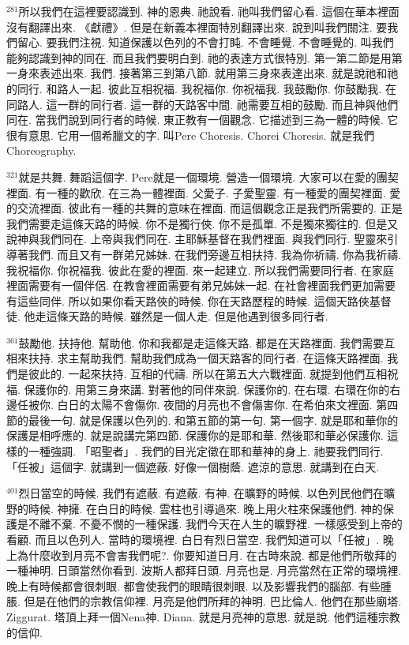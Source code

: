 \documentclass{book}
\begin{document}
$^{281}$所以我們在這裡要認識到.
神的恩典.
祂說看.
祂叫我們留心看.
這個在華本裡面沒有翻譯出來.
《獻禮》.
但是在新義本裡面特別翻譯出來.
說到叫我們關注.
要我們留心.
要我們注視.
知道保護以色列的不會打盹.
不會睡覺.
不會睡覺的.
叫我們能夠認識到神的同在.
而且我們要明白到.
祂的表達方式很特別.
第一第二節是用第一身來表述出來.
我們.
接著第三到第八節.
就用第三身來表達出來.
就是說祂和祂的同行.
和路人一起.
彼此互相祝福.
我祝福你.
你祝福我.
我鼓勵你.
你鼓勵我.
在同路人.
這一群的同行者.
這一群的天路客中間.
祂需要互相的鼓勵.
而且神與他們同在.
當我們說到同行者的時候.
東正教有一個觀念.
它描述到三為一體的時候.
它很有意思.
它用一個希臘文的字.
叫Pere Choresis.
Chorei Choresis.
就是我們Choreography.

$^{321}$就是共舞.
舞蹈這個字.
Pere就是一個環境.
營造一個環境.
大家可以在愛的團契裡面.
有一種的歡欣.
在三為一體裡面.
父愛子.
子愛聖靈.
有一種愛的團契裡面.
愛的交流裡面.
彼此有一種的共舞的意味在裡面.
而這個觀念正是我們所需要的.
正是我們需要走這條天路的時候.
你不是獨行俠.
你不是孤單.
不是獨來獨往的.
但是又說神與我們同在.
上帝與我們同在.
主耶穌基督在我們裡面.
與我們同行.
聖靈來引導著我們.
而且又有一群弟兄姊妹.
在我們旁邊互相扶持.
我為你祈禱.
你為我祈禱.
我祝福你.
你祝福我.
彼此在愛的裡面.
來一起建立.
所以我們需要同行者.
在家庭裡面需要有一個伴侶.
在教會裡面需要有弟兄姊妹一起.
在社會裡面我們更加需要有這些同伴.
所以如果你看天路俠的時候.
你在天路歷程的時候.
這個天路俠基督徒.
他走這條天路的時候.
雖然是一個人走.
但是他遇到很多同行者.

$^{361}$鼓勵他.
扶持他.
幫助他.
你和我都是走這條天路.
都是在天路裡面.
我們需要互相來扶持.
求主幫助我們.
幫助我們成為一個天路客的同行者.
在這條天路裡面.
我們是彼此的.
一起來扶持.
互相的代禱.
所以在第五大六戰裡面.
就提到他們互相祝福.
保護你的.
用第三身來講.
對著他的同伴來說.
保護你的.
在右環.
右環在你的右邊任被你.
白日的太陽不會傷你.
夜間的月亮也不會傷害你.
在希伯來文裡面.
第四節的最後一句.
就是保護以色列的.
和第五節的第一句.
第一個字.
就是耶和華你的保護是相呼應的.
就是說講完第四節.
保護你的是耶和華.
然後耶和華必保護你.
這樣的一種強調.
「昭聖者」.
我們的目光定徵在耶和華神的身上.
祂要我們同行.
「任被」這個字.
就講到一個遮蔽.
好像一個樹蔭.
遮涼的意思.
就講到在白天.

$^{401}$烈日當空的時候.
我們有遮蔽.
有遮蔽.
有神.
在曠野的時候.
以色列民他們在曠野的時候.
神擁.
在白日的時候.
雲柱也引導過來.
晚上用火柱來保護他們.
神的保護是不離不棄.
不憂不憫的一種保護.
我們今天在人生的曠野裡.
一樣感受到上帝的看顧.
而且以色列人.
當時的環境裡.
白日有烈日當空.
我們知道可以「任被」.
晚上為什麼收到月亮不會害我們呢?.
你要知道日月.
在古時來說.
都是他們所敬拜的一種神明.
日頭當然你看到.
波斯人都拜日頭.
月亮也是.
月亮當然在正常的環境裡.
晚上有時候都會很刺眼.
都會使我們的眼睛很刺眼.
以及影響我們的腦部.
有些腫脹.
但是在他們的宗教信仰裡.
月亮是他們所拜的神明.
巴比倫人.
他們在那些廟塔.
Ziggurat.
塔頂上拜一個Nena神.
Diana.
就是月亮神的意思.
就是說.
他們這種宗教的信仰.
\end{document}
